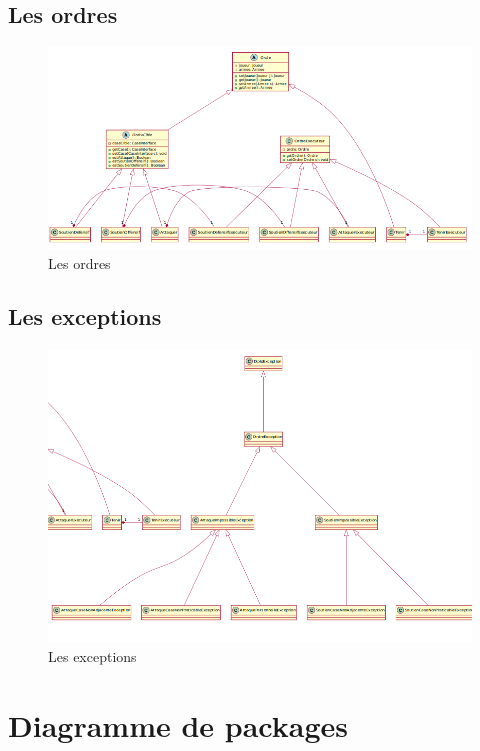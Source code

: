 \subsection{Les ordres}
	\begin{figure}[!h]
		\centering
		\includegraphics[scale=0.5]{images/DCP2.png}
		\caption{Les ordres}
	\end{figure}

\subsection{Les exceptions}
	\vspace{10mm}
	\begin{figure}[!h]
		\centering
		\includegraphics[scale=0.5]{images/DCP3.png}
		\caption{Les exceptions}
	\end{figure}
\newpage
\section{Diagramme de packages}
